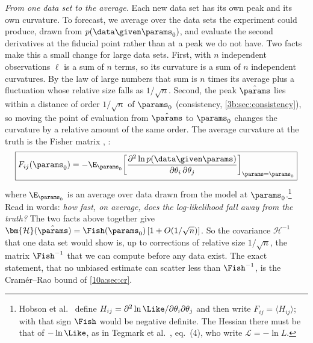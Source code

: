 \emph{From one data set to the average.} Each new data set has its own peak and its own curvature. To
forecast, we average over the data sets the experiment could produce, drawn from $p(\data\given\params_0)$, and
evaluate the second derivatives at the fiducial point rather than at a peak we do not have. Two facts make
this a small change for large data sets. First, with $n$ independent observations $\ell$ is a sum of $n$ terms,
so its curvature is a sum of $n$ independent curvatures. By the law of large numbers that sum is $n$ times
its average plus a fluctuation whose relative size falls as $1/\sqrt n$. Second, the peak $\hat\params$ lies
within a distance of order $1/\sqrt n$ of $\params_0$ (consistency, \cref{3b:sec:consistency}), so moving the point
of evaluation from $\hat\params$ to $\params_0$ changes the curvature by a relative amount of the same order.
The average curvature at the truth is the Fisher matrix , \cite{TTH1997}:
\begin{equation}
  \boxed{F_{ij}(\params_0)=-\E_{\params_0}\!\left[\frac{\partial^2\ln p(\data\given\params)}{\partial\theta_i\,\partial\theta_j}\right]_{\params=\params_0}}
  \label{10a:eq:fisher-def}
\end{equation}
where $\E_{\params_0}$ is an average over data drawn from the model at $\params_0$.\footnote{Hobson et al.\
 define $H_{ij}=\partial^2\ln\Like/\partial\theta_i\partial\theta_j$ and then
write $F_{ij}=\langle H_{ij}\rangle$; with that sign $\Fish$ would be negative definite. The Hessian there must
be that of $-\ln\Like$, as in Tegmark et al.\ \cite{TTH1997}, eq.~(4), who write $\mathcal L=-\ln L$.} Read in
words: \emph{how fast, on average, does the log-likelihood fall away from the truth?} The two facts above
together give $\bm{\mathcal H}(\hat\params)=\Fish(\params_0)\,[1+O(1/\sqrt n)]$. So the covariance $\bm{\mathcal H}^{-1}$ that
one data set would show is, up to corrections of relative size $1/\sqrt n$, the matrix $\Fish^{-1}$ that we can
compute before any data exist. The exact statement, that no unbiased estimate can scatter less than
$\Fish^{-1}$, is the Cram\'er--Rao bound of \cref{10a:sec:cr}.

